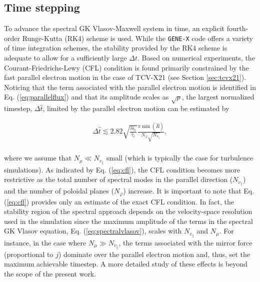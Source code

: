 \documentclass[preprint,12pt]{elsarticle}
\begin{document}
\subsection{Time stepping}
\label{subsec:timestepping}

To advance the spectral GK Vlasov-Maxwell system in time, an explicit fourth-order Runge-Kutta (RK4) scheme is used. While the  \verb|GENE-X| code offers a variety of time integration schemes, the stability provided by the RK4 scheme is adequate to allow for a sufficiently large $\Delta t$. Based on numerical experiments, the Courant-Friedrichs-Lewy (CFL) condition \cite{courant1928} is found primarily constrained by the fast parallel electron motion in the case of TCV-X21 (see Section \ref{sec:tcvx21}). Noticing that the term associated with the parallel electron motion is identified in Eq. (\ref{eq:parallelflux}) and that its amplitude scales as $\sqrt{p}$, the largest normalized timestep, $\Delta \hat{t}$, limited by the parallel electron motion can be estimated by

\begin{align} \label{eq:cfl}
  \Delta \hat{t} \lesssim 2.82 \sqrt{\frac{\hat{m}_e}{\hat{\tau}_e}} \frac{\pi \min (\hat R )}{N_\varphi \sqrt{N_{v_\parallel}}},
\end{align}
\\
where we assume that $N_{\mu} \ll N_{v_\parallel}$ small (which is typically the case for turbulence simulations). As indicated by Eq. (\ref{eq:cfl}), the CFL condition becomes more restrictive as the total number of spectral modes in the parallel direction ($N_{v_\parallel}$) and the number of poloidal planes ($N_\varphi$) increase. It is important to note that Eq. (\ref{eq:cfl}) provides only an estimate of the exact CFL condition. In fact, the stability region of the spectral approach depends on the velocity-space resolution used in the simulation since the maximum amplitude of the terms in the spectral GK Vlasov equation, Eq. (\ref{eq:spectralvlasov}), scales with $N_{v_\parallel}$ and $N_\mu$. For instance, in the case where $N_\mu \gg N_{v_\parallel}$, the terms associated with the mirror force (proportional to $j$) dominate over the parallel electron motion and, thus, set the maximum achievable timestep. A more detailed study of these effects is beyond the scope of the present work.
\end{document}
